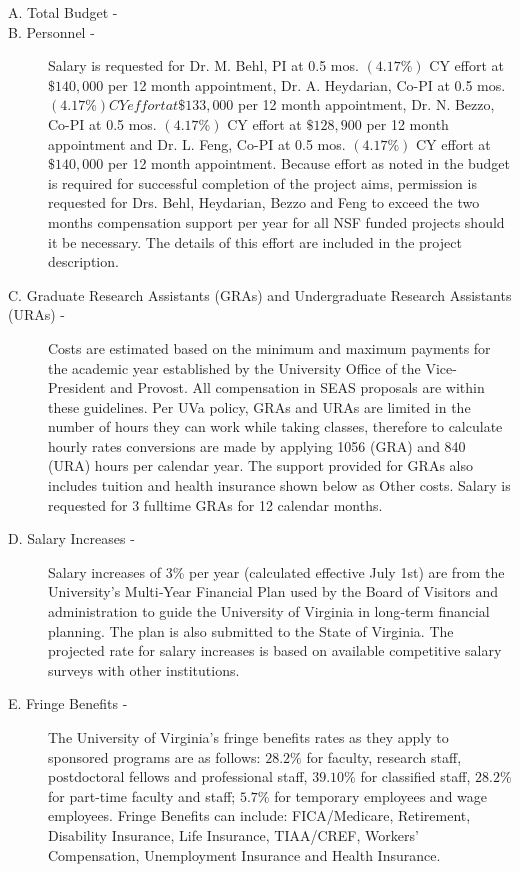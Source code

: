 \begin{description}

\item[A. Total Budget - ]

\item[B. Personnel - ]

Salary is requested for Dr. M. Behl, PI at 0.5 mos. $(4.17\%)$ CY effort at $\$140,000$ per 12 month appointment, Dr. A. Heydarian, Co-PI at 0.5 mos. $(4.17\%)$$ CY effort at $$\$133,000$ per 12 month appointment, Dr. N. Bezzo, Co-PI at 0.5 mos. $(4.17\%)$ CY effort at $\$128,900$ per 12 month appointment and Dr. L. Feng, Co-PI at 0.5 mos. $(4.17\%)$ CY effort at $\$140,000$ per 12 month appointment.  Because effort as noted in the budget is required for successful completion of the project aims, permission is requested for Drs. Behl, Heydarian, Bezzo and Feng to exceed the two months compensation support per year for all NSF funded projects should it be necessary.  The details of this effort are included in the project description.

\item[C. Graduate Research Assistants (GRAs) and Undergraduate Research Assistants (URAs) -]

Costs are estimated based on the minimum and maximum payments for the academic year established by the University Office of the Vice-President and Provost.  All compensation in SEAS proposals are within these guidelines.  Per UVa policy, GRAs and URAs are limited in the number of hours they can work while taking classes, therefore to calculate hourly rates conversions are made by applying 1056 (GRA) and 840 (URA) hours per calendar year.  The support provided for GRAs also includes tuition and health insurance shown below as Other costs.  Salary is requested for 3 fulltime GRAs for 12 calendar months.

\item[D. Salary Increases - ]

Salary increases of $3\%$ per year (calculated effective July 1st) are from the University's Multi‐Year Financial Plan used by the Board of Visitors and administration to guide the University of Virginia in long‐term financial planning. The plan is also submitted to the State of Virginia. The projected rate for salary increases is based on available competitive salary surveys with other institutions. 

\item[E. Fringe Benefits - ]

The University of Virginia's fringe benefits rates as they apply to sponsored programs are as follows:  $28.2\%$ for faculty, research staff, postdoctoral fellows and professional staff, $39.10\%$ for classified staff, $28.2\%$ for part-time faculty and staff; $5.7\%$ for temporary employees and wage employees.  Fringe Benefits can include:  FICA/Medicare, Retirement, Disability Insurance, Life Insurance, TIAA/CREF, Workers’ Compensation, Unemployment Insurance and Health Insurance.


\end{description}
